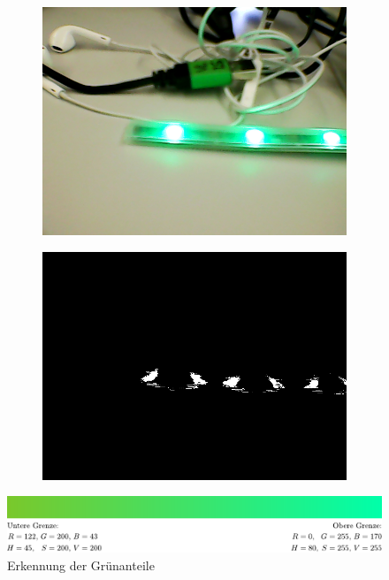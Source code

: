 \documentclass[a4paper, 12pt]{scrartcl}
\begin{document}
\begin{figure}[H]
	\centering
	\begin{subfigure}{.5\textwidth}
		\centering
		\includegraphics[width=\textwidth]{../testbilder/gruen.png}
	\end{subfigure}%
	\begin{subfigure}{.5\textwidth}
		\centering
		\includegraphics[width=\textwidth]{../testbilder/gruen2.png}
	\end{subfigure}
	\vspace{1ex}
	
	\includegraphics[width=1\textwidth]{../testbilder/Gruen_Bereich.pdf}
	\caption{Erkennung der Grünanteile}
\end{figure}
\end{document}
